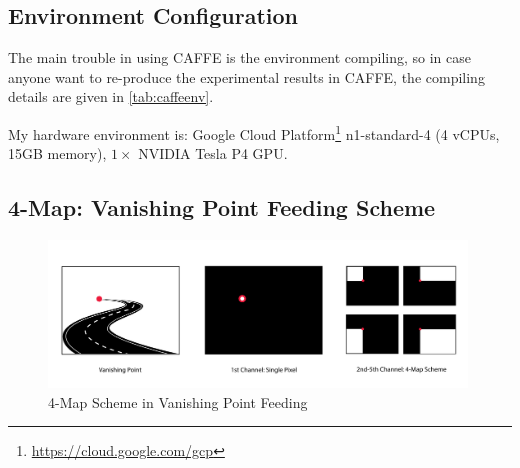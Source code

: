 \begin{spacing}{1.5}
\subsection{Environment Configuration}

\begin{table}[ht]
\centering
\caption{Dependency Environment of CAFFE v1.0}
\label{tab:caffeenv}
\end{table}

The main trouble in using CAFFE is the environment compiling, so in case anyone want to re-produce the experimental results in CAFFE, the compiling details are given in \autoref{tab:caffeenv}.

My hardware environment is: Google Cloud Platform\footnote{\url{https://cloud.google.com/gcp}} n1-standard-4 (4 vCPUs, 15GB memory), $1 \times$ NVIDIA Tesla P4 GPU.

\subsection{4-Map: Vanishing Point Feeding Scheme}
\label{subsec:fourmap}

\begin{figure}[ht]
\centering
\includegraphics[width=0.99\textwidth, fbox]{Chapter3/fourmap.pdf}
\caption{4-Map Scheme in Vanishing Point Feeding}
\label{fig:fourmap} 
\end{figure}



\end{spacing}
